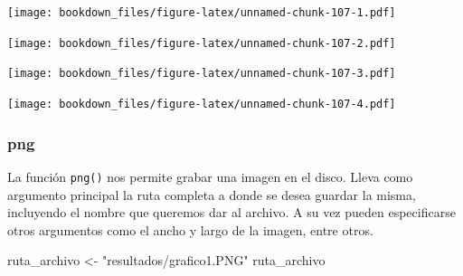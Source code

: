 \documentclass[]{book}
\newenvironment{Shaded}{\begin{snugshade}}{\end{snugshade}}
\newcommand{\CommentTok}[1]{\textcolor[rgb]{0.56,0.35,0.01}{\textit{#1}}}
\newcommand{\DataTypeTok}[1]{\textcolor[rgb]{0.13,0.29,0.53}{#1}}
\newcommand{\KeywordTok}[1]{\textcolor[rgb]{0.13,0.29,0.53}{\textbf{#1}}}
\newcommand{\NormalTok}[1]{#1}
\newcommand{\OperatorTok}[1]{\textcolor[rgb]{0.81,0.36,0.00}{\textbf{#1}}}
\newcommand{\StringTok}[1]{\textcolor[rgb]{0.31,0.60,0.02}{#1}}
\begin{document}
\texttt{[image: bookdown\_files/figure-latex/unnamed-chunk-107-1.pdf]}

\begin{Shaded}
\end{Shaded}

\texttt{[image: bookdown\_files/figure-latex/unnamed-chunk-107-2.pdf]}

\begin{Shaded}
\end{Shaded}

\texttt{[image: bookdown\_files/figure-latex/unnamed-chunk-107-3.pdf]}

\begin{Shaded}
\end{Shaded}

\texttt{[image: bookdown\_files/figure-latex/unnamed-chunk-107-4.pdf]}

\hypertarget{png}{%
\subsubsection{png}\label{png}}

La función \texttt{png()} nos permite grabar una imagen en el disco. Lleva como argumento principal la ruta completa a donde se desea guardar la misma, incluyendo el nombre que queremos dar al archivo. A su vez pueden especificarse otros argumentos como el ancho y largo de la imagen, entre otros.

\begin{Shaded}
\begin{Highlighting}[]
\NormalTok{ruta_archivo <-}\StringTok{ "resultados/grafico1.PNG"}
\NormalTok{ruta_archivo}
\end{Highlighting}
\end{Shaded}
\end{document}
